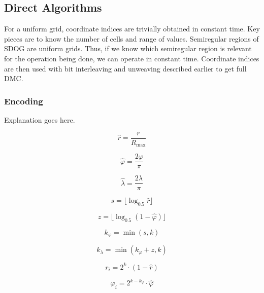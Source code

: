 \subsection{Direct Algorithms}
For a uniform grid, coordinate indices are trivially obtained in constant time.
Key pieces are to know the number of cells and range of values.
Semiregular regions of SDOG are uniform grids.
Thus, if we know which semiregular region is relevant for the operation being done, we can operate in constant time.
Coordinate indices are then used with bit interleaving and unweaving described earlier to get full DMC.


\subsubsection{Encoding}
Explanation goes here.

\begin{equation*}
\hat{r} = \frac{r}{R_\mathrm{max}}
\end{equation*}

\begin{equation*}
\hat{\varphi} = \frac{2 \varphi}{\pi}
\end{equation*}

\begin{equation*}
\hat{\lambda} = \frac{2 \lambda}{\pi}
\end{equation*}

\begin{equation*}
s = \lfloor \log_{0.5} \hat{r} \rfloor
\end{equation*}

\begin{equation*}
z = \lfloor \log_{0.5} ( 1 - \hat{\varphi} ) \rfloor
\end{equation*}

\begin{equation*}
k_\varphi = \min ( s, k )
\end{equation*}

\begin{equation*}
k_\lambda = \min ( k_\varphi + z, k )
\end{equation*}

\begin{equation*}
r_i = 2^k \cdot ( 1 - \hat{r} )
\end{equation*}

\begin{equation*}
\varphi_i = 2^{k - k_\varphi} \cdot \hat{\varphi}
\end{equation*}

